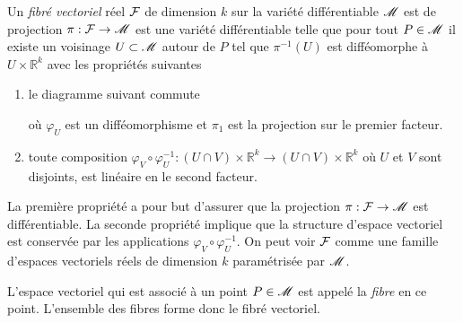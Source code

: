 \documentclass[a4paper,11pt]{report}
\begin{document}
                \begin{defn}
                    Un \textit{fibré vectoriel} réel $\mathcal{F}$ de dimension $k$ sur la variété différentiable $\mathscr{M}$ est de projection $\pi:\mathcal{F}\to\mathscr{M}$ est une variété différentiable telle que pour tout $P\in\mathscr{M}$ il existe un voisinage $U\subset\mathscr{M}$ autour de $P$ tel que $\pi^{-1}(U)$ est difféomorphe à $U\times \mathbb{R}^k$ avec les propriétés suivantes
                    \begin{enumerate}[label = \textit{\roman*)}]
                        \item le diagramme suivant commute
                        \begin{center}
                        \end{center}
                        où $\varphi_U$ est un difféomorphisme et $\pi_1$ est la projection sur le premier facteur.
                        \item toute composition $\varphi_V\circ\varphi_U^{-1} : (U\cap V)\times \mathbb{R}^k\to (U\cap V)\times \mathbb{R}^k$ où $U$ et $V$ sont disjoints, est linéaire en le second facteur.
                    \end{enumerate}
                \end{defn}
                
                La première propriété a pour but d'assurer que la projection $\pi:\mathcal{F}\to\mathscr{M}$ est différentiable. La seconde propriété implique que la structure d'espace vectoriel est conservée par les applications $\varphi_V\circ\varphi_U^{-1}$. On peut voir $\mathcal{F}$ comme une famille d'espaces vectoriels réels de dimension $k$ paramétrisée par $\mathscr{M}$.\\
                
                \begin{defn}
                    L'espace vectoriel qui est associé à un point $P\in\mathscr{M}$ est appelé la \textit{fibre} en ce point. L'ensemble des fibres forme donc le fibré vectoriel.
                \end{defn}
                
\end{document}
